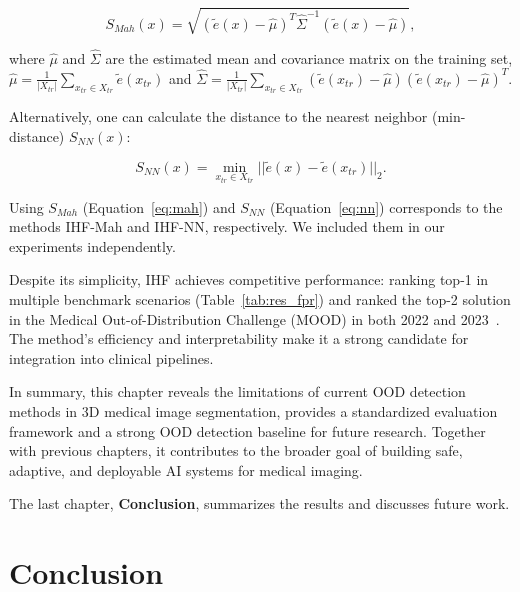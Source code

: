 \begin{equation}
	\label{eq:mah}
	S_{Mah}(x) = \sqrt{ \left( \tilde{e}(x) - \hat{\mu} \right)^T \hat{\Sigma}^{-1} \left( \tilde{e}(x) - \hat{\mu} \right) },
\end{equation}

\noindent
where $\hat{\mu}$ and $\hat{\Sigma}$ are the estimated mean and covariance matrix on the training set, $\hat{\mu} = \frac{1}{|X_{tr}|} \sum_{x_{tr} \in X_{tr}} \tilde{e} \left(x_{tr}\right)$ and $\hat{\Sigma} = \frac{1}{|X_{tr}|} \sum_{x_{tr} \in X_{tr}} \left( \tilde{e} (x_{tr}) - \hat{\mu} \right) \left( \tilde{e} (x_{tr}) - \hat{\mu} \right)^T$.

Alternatively, one can calculate the distance to the nearest neighbor (min-distance) $S_{NN}(x)$:

\begin{equation}
	\label{eq:nn}
	S_{NN}(x) = \min_{x_{tr} \in X_{tr}} || \tilde{e} (x) - \tilde{e} (x_{tr}) ||_2.
\end{equation}

Using $S_{Mah}$ (Equation~\ref{eq:mah}) and $S_{NN}$ (Equation~\ref{eq:nn}) corresponds to the methods IHF-Mah and IHF-NN, respectively. We included them in our experiments independently.

Despite its simplicity, IHF achieves competitive performance: ranking top-1 in multiple benchmark scenarios (Table~\ref{tab:res_fpr}) and ranked the top-2 solution in the Medical Out-of-Distribution Challenge (MOOD) in both 2022 and 2023~\cite{zimmerer2022mood}. The method’s efficiency and interpretability make it a strong candidate for integration into clinical pipelines.

In summary, this chapter reveals the limitations of current OOD detection methods in 3D medical image segmentation, provides a standardized evaluation framework and a strong OOD detection baseline for future research. Together with previous chapters, it contributes to the broader goal of building safe, adaptive, and deployable AI systems for medical imaging.



The last chapter, \textbf{Conclusion}, summarizes the results and discusses future work.


\section*{Conclusion}

